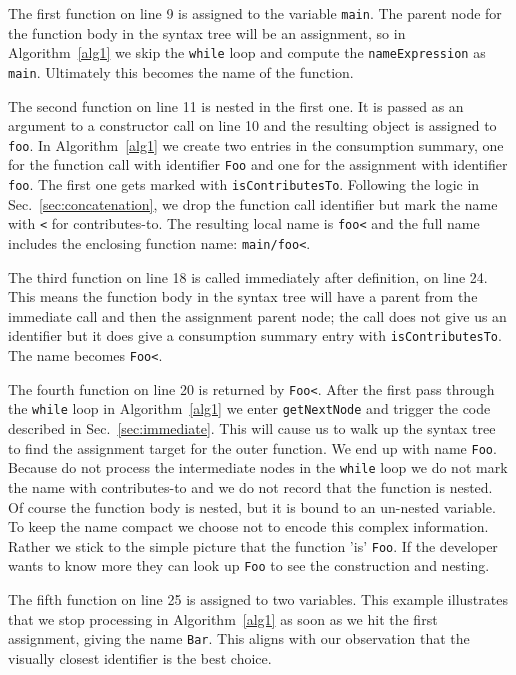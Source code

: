 \documentclass[10pt, preprint]{sigplanconf}
\begin{document}
The first function on line 9 is assigned to the variable \verb|main|. The parent node for the function body in the syntax tree will be an assignment, so in Algorithm~\ref{alg1} we skip the \verb|while| loop and compute the \verb|nameExpression| as \verb|main|.  Ultimately this becomes the name of the function.

The second function on line 11 is nested in the first one.  It is passed as an argument to a constructor call on line 10 and the resulting object is assigned to \verb|foo|. In Algorithm~\ref{alg1} we create two entries in the consumption summary, one for the function call with identifier \verb|Foo| and one for the assignment with identifier \verb|foo|. The first one gets marked with \verb|isContributesTo|.  Following the logic in Sec.~\ref{sec:concatenation}, we drop the function call identifier but mark the name with \verb|<| for contributes-to. The resulting local name is \verb|foo<| and the full name includes the enclosing function name: \verb|main/foo<|.

The third function on line 18 is called immediately after definition, on line 24. This means the function body in the syntax tree will have a parent from the immediate call and then the assignment parent node; the call does not give us an identifier but it does give a consumption summary entry with \verb|isContributesTo|. The name becomes \verb|Foo<|.

The fourth function on line 20 is returned by \verb|Foo<|. After the first pass through the \verb|while| loop in Algorithm~\ref{alg1} we enter \verb|getNextNode| and trigger the code described in Sec.~\ref{sec:immediate}.  This will cause us to walk up the syntax tree to find the assignment target for the outer function. We end up with name \verb|Foo|. Because do not process the intermediate nodes in the \verb|while| loop we do not mark the name with contributes-to and we do not record that the function is nested. Of course the function body is nested, but it is bound to an un-nested variable. To keep the name compact we choose not to encode this complex information. Rather we stick to the simple picture that the function 'is' \verb|Foo|. If the developer wants to know more they can look up \verb|Foo| to see the construction and nesting.

The fifth function on line 25 is assigned to two variables. This example illustrates that we stop processing in Algorithm~\ref{alg1} as soon as we hit the first assignment, giving the name \verb|Bar|. This aligns with our observation that the visually closest identifier is the best choice.
\end{document}
